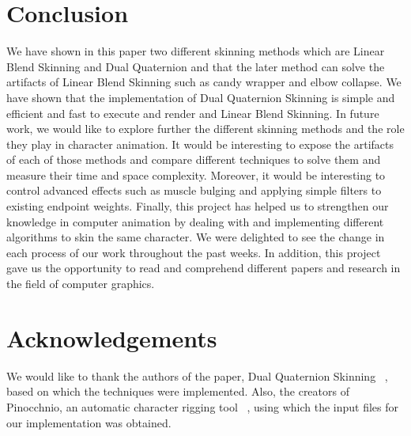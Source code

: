 \documentclass[annual]{styles/acmsiggraph}
\begin{document}
\section{Conclusion}

We have shown in this paper two different skinning methods which are Linear Blend Skinning and Dual Quaternion and that the later method can solve the artifacts of Linear Blend Skinning such as candy wrapper and elbow collapse. We have shown that the implementation of Dual Quaternion Skinning is simple and efficient and fast to execute and render and Linear Blend Skinning.
In future work, we would like to explore further the different skinning methods and the role they play in character animation.  It would be interesting to expose the artifacts of each of those methods and compare different techniques to solve them and measure their time and space complexity. Moreover, it would be interesting to control advanced effects such as muscle bulging and applying simple filters to existing endpoint weights.
Finally, this project has helped us to strengthen our knowledge in computer animation by dealing with and implementing different algorithms to skin the same character. We were delighted to see the change in each process of our work throughout the past weeks. In addition, this project gave us the opportunity to read and comprehend different papers and research in the field of computer graphics.

\section*{Acknowledgements}

We would like to thank the authors of the paper, Dual Quaternion Skinning ~\cite{Kavan-07-SDQ}, based on which the techniques were implemented. Also, the creators of Pinocchnio, an automatic character rigging tool ~\cite{Baran:2007:ARA:1275808.1276467}, using which the input files for our implementation was obtained. 



\end{document}
